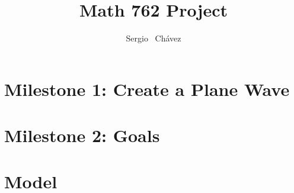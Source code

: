 \documentclass{article}
\title{Math 762 Project}
\author{
  Sergio ~Ch\'{a}vez
}
\begin{document}
\maketitle

\begin{abstract}

\end{abstract}



\section{Milestone 1: Create a Plane Wave}

\section{Milestone 2: Goals}

\section{Model}





\end{document}
